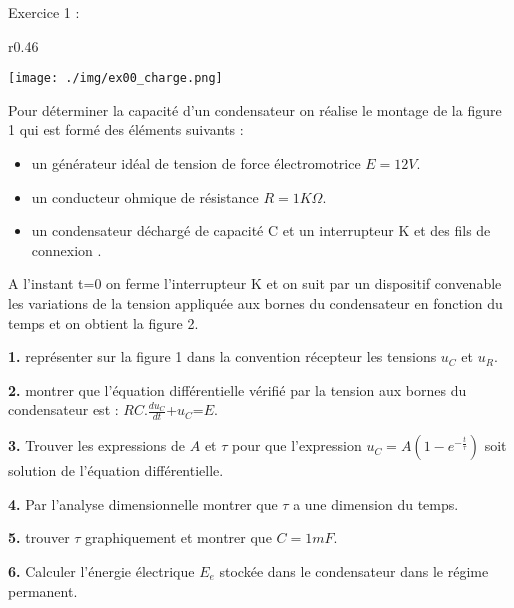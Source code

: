 \documentclass[12pt, french]{article}
\begin{document}
\begin{center}
\end{center}

\vspace{-0.2cm}



   \begin{Box2}{Exercice 1 :}
	   \begin{wrapfigure}[5]{r}{0.46\textwidth}
  \begin{center}
	  \vspace{-0.6cm}
	\texttt{[image: ./img/ex00\_charge.png]}
  \end{center}
\end{wrapfigure}


Pour déterminer la capacité d’un condensateur on réalise le montage de la figure 1 qui est
formé des éléments suivants :
\begin{itemize}
	\item un générateur idéal de tension de force électromotrice $E=12V$.
	\item un conducteur ohmique de résistance $R=1K\Omega$.
	\item un condensateur déchargé de capacité C et un interrupteur K et des fils de connexion .
\end{itemize}
A l’instant t=0 on ferme l’interrupteur K et on suit par un dispositif convenable les variations de la tension
appliquée aux bornes du condensateur en fonction du temps et on obtient la figure 2.

\textbf{1. }représenter sur la figure 1 dans la convention récepteur les tensions $u_C$ et $u_R$.

\textbf{2. }montrer que l’équation différentielle vérifié par la tension aux bornes du condensateur est : $RC.\frac{du_C}{dt}$+$u_C$=$E$.

\textbf{3. }Trouver les expressions de $A$ et $\tau$ pour que l’expression $u_C = A(1-e^{-\frac{t}{\tau}} )$ soit solution de l’équation différentielle.

\textbf{4. }Par l’analyse dimensionnelle montrer que $\tau$ a une dimension du temps.

\textbf{5. }trouver $\tau$ graphiquement et montrer que $C=1mF$.

\textbf{6. }Calculer l’énergie électrique $E_e$ stockée dans le condensateur dans le régime permanent.
   \end{Box2}
\end{document}

